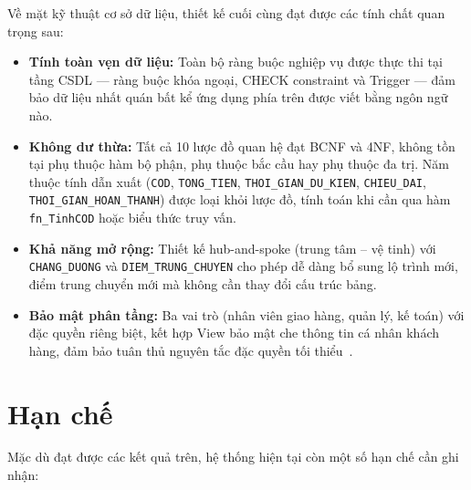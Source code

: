 \documentclass[11pt]{report}
\begin{document}
Về mặt kỹ thuật cơ sở dữ liệu, thiết kế cuối cùng đạt được các tính chất quan trọng sau:

\begin{itemize}
    \item \textbf{Tính toàn vẹn dữ liệu:} Toàn bộ ràng buộc nghiệp vụ được thực thi tại tầng CSDL --- ràng buộc khóa ngoại, CHECK constraint và Trigger --- đảm bảo dữ liệu nhất quán bất kể ứng dụng phía trên được viết bằng ngôn ngữ nào.

    \item \textbf{Không dư thừa:} Tất cả 10 lược đồ quan hệ đạt BCNF và 4NF, không tồn tại phụ thuộc hàm bộ phận, phụ thuộc bắc cầu hay phụ thuộc đa trị. Năm thuộc tính dẫn xuất (\texttt{COD}, \texttt{TONG\_TIEN}, \texttt{THOI\_GIAN\_DU\_KIEN}, \texttt{CHIEU\_DAI}, \texttt{THOI\_GIAN\_HOAN\_THANH}) được loại khỏi lược đồ, tính toán khi cần qua hàm \texttt{fn\_TinhCOD} hoặc biểu thức truy vấn.

    \item \textbf{Khả năng mở rộng:} Thiết kế hub-and-spoke (trung tâm -- vệ tinh) với \texttt{CHANG\_DUONG} và \texttt{DIEM\_TRUNG\_CHUYEN} cho phép dễ dàng bổ sung lộ trình mới, điểm trung chuyển mới mà không cần thay đổi cấu trúc bảng.

    \item \textbf{Bảo mật phân tầng:} Ba vai trò (nhân viên giao hàng, quản lý, kế toán) với đặc quyền riêng biệt, kết hợp View bảo mật che thông tin cá nhân khách hàng, đảm bảo tuân thủ nguyên tắc đặc quyền tối thiểu~\cite{mysql80_security}.
\end{itemize}


\section{Hạn chế}
\label{sec:ketluan_hanche}

Mặc dù đạt được các kết quả trên, hệ thống hiện tại còn một số hạn chế cần ghi nhận:
\end{document}
